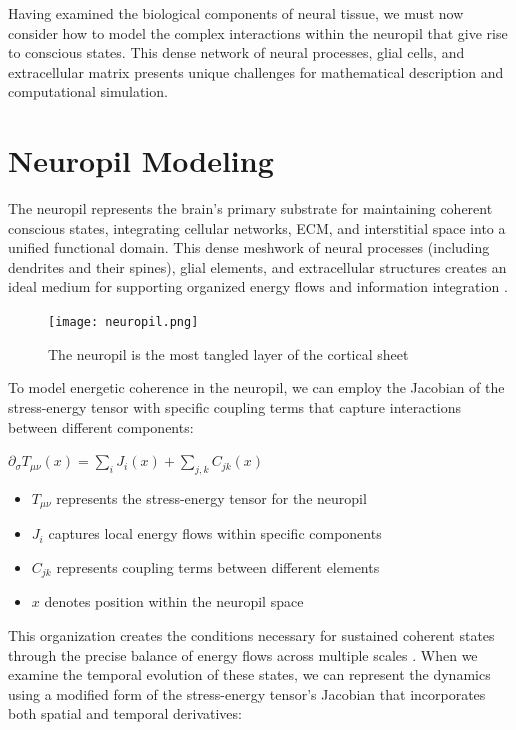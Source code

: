 \begin{refsection}
Having examined the biological components of neural tissue, we must now consider how to model the complex interactions within the neuropil that give rise to conscious states. This dense network of neural processes, glial cells, and extracellular matrix presents unique challenges for mathematical description and computational simulation.

\section{Neuropil Modeling}

The neuropil represents the brain's primary substrate for maintaining coherent conscious states, integrating cellular networks, ECM, and interstitial space into a unified functional domain. This dense meshwork of neural processes (including dendrites and their spines), glial elements, and extracellular structures creates an ideal medium for supporting organized energy flows and information integration \cite{Kasthuri2015}.

\begin{figure}[h]
    \centering
    \texttt{[image: neuropil.png]}

    \caption{The neuropil is the most tangled layer of the cortical sheet}
\end{figure}

To model energetic coherence in the neuropil, we can employ the Jacobian of the stress-energy tensor with specific coupling terms that capture interactions between different components:

$\partial_\sigma T_{\mu\nu}(x) = \sum_i J_i(x) + \sum_{j,k} C_{jk}(x)$

\begin{itemize}
\item $T_{\mu\nu}$ represents the stress-energy tensor for the neuropil
\item $J_i$ captures local energy flows within specific components
\item $C_{jk}$ represents coupling terms between different elements
\item $x$ denotes position within the neuropil space
\end{itemize}

This organization creates the conditions necessary for sustained coherent states through the precise balance of energy flows across multiple scales \cite{Mishchenko2010}. When we examine the temporal evolution of these states, we can represent the dynamics using a modified form of the stress-energy tensor's Jacobian that incorporates both spatial and temporal derivatives:


\end{refsection}

